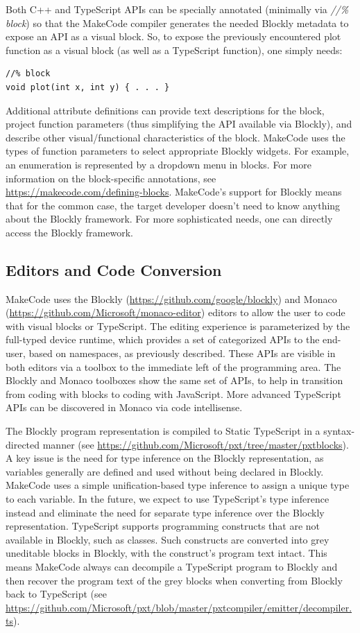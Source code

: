 Both C++ and TypeScript APIs can be specially annotated (minimally via 
\emph{//\% block}) so that the MakeCode compiler generates the needed
Blockly metadata to expose an API as a visual block. So, to expose the previously
encountered plot function as a visual block (as well as a TypeScript function), one simply needs:
\begin{lstlisting}
//% block
void plot(int x, int y) { . . . }
\end{lstlisting}

Additional attribute definitions can provide text descriptions for the block, project function
parameters (thus simplifying the API available via Blockly), and describe other visual/functional
characteristics of the block.  MakeCode uses the types of function parameters to select appropriate
Blockly widgets.  For example, an enumeration is represented by a dropdown menu in blocks.
For more information on the block-specific annotations, see 
\url{https://makecode.com/defining-blocks}. 
MakeCode's support for Blockly means that for the common case, the target developer doesn't need
to know anything about the Blockly framework.  For more sophisticated needs, one can directly access
the Blockly framework. 

\subsection{Editors and Code Conversion}

MakeCode uses the Blockly (\url{https://github.com/google/blockly}) and Monaco 
(\url{https://github.com/Microsoft/monaco-editor}) editors to allow the user to code with
visual blocks or TypeScript. The editing experience is parameterized by the full-typed device
runtime, which provides a set of categorized APIs to the end-user, based on namespaces, as
previously described. These APIs are visible in both editors via a toolbox to the immediate
left of the programming area. The Blockly and Monaco toolboxes show the same set of APIs, to
help in transition from coding with blocks to coding with JavaScript. More advanced TypeScript
APIs can be discovered in Monaco via code intellisense.

The Blockly program representation is compiled to Static TypeScript in a syntax-directed manner
(see \url{https://github.com/Microsoft/pxt/tree/master/pxtblocks}). A key issue is the need for
type inference on the Blockly representation, as variables generally are defined and used without
being declared in Blockly. MakeCode uses a simple unification-based type inference to assign a
unique type to each variable.  In the future, we expect to use TypeScript's type inference instead
and eliminate the need for separate type inference over the Blockly representation. 
TypeScript supports programming constructs that are not available in Blockly, such as classes.
Such constructs are converted into grey uneditable blocks in Blockly, with the construct's program
text intact. This means MakeCode always can decompile a TypeScript program to Blockly and then recover
the program text of the grey blocks when converting from Blockly back to TypeScript
 (see \url{https://github.com/Microsoft/pxt/blob/master/pxtcompiler/emitter/decompiler.ts}). 

